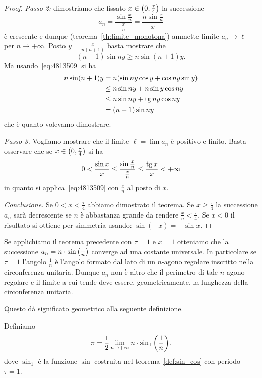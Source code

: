 \begin{proof}
\emph{Passo 2:}
dimostriamo che fissato $x\in \left(0,\frac \tau 4\right)$ 
la successione 
\[
  a_n = \frac{\sin \frac x n}{\frac x n} = \frac{n\sin \frac x n}{x}
\]
è crescente e dunque
(teorema~\ref{th:limite_monotona})
ammette limite $a_n \to \ell$ per $n\to +\infty$.
Posto $y=\frac{x}{n(n+1)}$ basta mostrare che 
\[
  (n+1) \sin ny \ge n \sin (n+1)y.  
\]
Ma usando~\eqref{eq:4813509} si ha 
\begin{align*}
  n \sin(n+1)y
  &=n(\sin ny\cos y + \cos ny \sin y) \\
  &\le n\sin ny + n\sin y\cos ny\\
  &\le n\sin ny + \operatorname{tg} ny\cos ny\\
  &= (n+1)\sin ny
\end{align*}
che è quanto volevamo dimostrare.

\emph{Passo 3.}
Vogliamo mostrare che il limite $\ell=\lim a_n$ è positivo e 
finito.
Basta osservare che se $x\in\left(0,\frac \tau 4\right)$
si ha
\[
0 < \frac{\sin x}{x} 
\le \frac{\sin \frac x n}{\frac x n} 
\le \frac{\operatorname{tg} x}{x} < +\infty
\]
in quanto si applica~\eqref{eq:4813509} 
con $\frac x n$ al posto di $x$. 

\emph{Conclusione.}
Se $0<x<\frac \tau 4$ abbiamo dimostrato il teorema.
Se $x\ge \frac \tau 4$ la successione $a_n$ sarà decrescente 
se $n$ è abbastanza grande da rendere $\frac x n < \frac \tau 4$.
Se $x<0$ il risultato si ottiene per simmetria usando: $\sin(-x)=-\sin x$.
\end{proof}

Se applichiamo il teorema precedente 
con $\tau=1$ e $x=1$ otteniamo che la successione 
$a_n = n\cdot \sin{\left( \frac 1 n \right)}$ converge 
ad una costante universale.
In particolare se $\tau=1$ l'angolo $\frac 1 n$ 
è l'angolo formato dal lato di un $n$-agono 
regolare inscritto nella circonferenza unitaria.
Dunque $a_n$ non è altro che il perimetro di tale 
$n$-agono regolare e il limite a cui tende deve essere,
geometricamente, la lunghezza della circonferenza unitaria.

Questo dà significato geometrico alla seguente definizione.

\begin{definition}%
  \label{def:pi}%
Definiamo
\[
 \pi 
  = \frac 1 2 \lim_{n\to +\infty} n\cdot \sin_1 {\left( \frac 1 n \right)}.
\]
dove $\sin_1$ è la funzione $\sin$ costruita nel 
teorema~\ref{def:sin_cos} con periodo $\tau=1$.
\end{definition}

